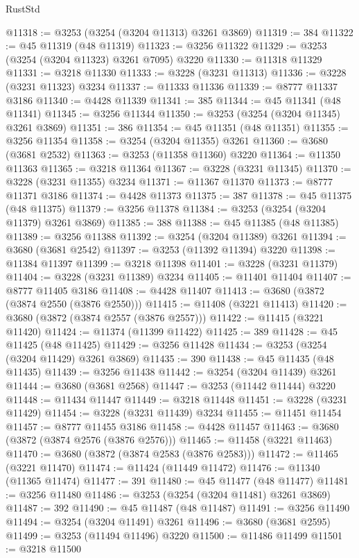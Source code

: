 \begin{lexlean}{RustStd}
\begin{coremodule}
{\begin{coremodule}
{{{{{{{{{{{{{{{{{{{{{{{{{{{{{{{{{{{{{@11318 := @3253 (@3254 (@3204 @11313) @3261 @3869)
@11319 := 384
@11322 := @45 @11319 (@48 @11319)
@11323 := @3256 @11322
@11329 := @3253 (@3254 (@3204 @11323) @3261 @7095) @3220
@11330 := @11318 @11329
@11331 := @3218 @11330
@11333 := @3228 (@3231 @11313)
@11336 := @3228 (@3231 @11323) @3234
@11337 := @11333 @11336
@11339 := @8777 @11337 @3186
@11340 := @4428 @11339
@11341 := 385
@11344 := @45 @11341 (@48 @11341)
@11345 := @3256 @11344
@11350 := @3253 (@3254 (@3204 @11345) @3261 @3869)
@11351 := 386
@11354 := @45 @11351 (@48 @11351)
@11355 := @3256 @11354
@11358 := @3254 (@3204 @11355) @3261
@11360 := @3680 (@3681 @2532)
@11363 := @3253 (@11358 @11360) @3220
@11364 := @11350 @11363
@11365 := @3218 @11364
@11367 := @3228 (@3231 @11345)
@11370 := @3228 (@3231 @11355) @3234
@11371 := @11367 @11370
@11373 := @8777 @11371 @3186
@11374 := @4428 @11373
@11375 := 387
@11378 := @45 @11375 (@48 @11375)
@11379 := @3256 @11378
@11384 := @3253 (@3254 (@3204 @11379) @3261 @3869)
@11385 := 388
@11388 := @45 @11385 (@48 @11385)
@11389 := @3256 @11388
@11392 := @3254 (@3204 @11389) @3261
@11394 := @3680 (@3681 @2542)
@11397 := @3253 (@11392 @11394) @3220
@11398 := @11384 @11397
@11399 := @3218 @11398
@11401 := @3228 (@3231 @11379)
@11404 := @3228 (@3231 @11389) @3234
@11405 := @11401 @11404
@11407 := @8777 @11405 @3186
@11408 := @4428 @11407
@11413 := @3680 (@3872 (@3874 @2550 (@3876 @2550)))
@11415 := @11408 (@3221 @11413)
@11420 := @3680 (@3872 (@3874 @2557 (@3876 @2557)))
@11422 := @11415 (@3221 @11420)
@11424 := @11374 (@11399 @11422)
@11425 := 389
@11428 := @45 @11425 (@48 @11425)
@11429 := @3256 @11428
@11434 := @3253 (@3254 (@3204 @11429) @3261 @3869)
@11435 := 390
@11438 := @45 @11435 (@48 @11435)
@11439 := @3256 @11438
@11442 := @3254 (@3204 @11439) @3261
@11444 := @3680 (@3681 @2568)
@11447 := @3253 (@11442 @11444) @3220
@11448 := @11434 @11447
@11449 := @3218 @11448
@11451 := @3228 (@3231 @11429)
@11454 := @3228 (@3231 @11439) @3234
@11455 := @11451 @11454
@11457 := @8777 @11455 @3186
@11458 := @4428 @11457
@11463 := @3680 (@3872 (@3874 @2576 (@3876 @2576)))
@11465 := @11458 (@3221 @11463)
@11470 := @3680 (@3872 (@3874 @2583 (@3876 @2583)))
@11472 := @11465 (@3221 @11470)
@11474 := @11424 (@11449 @11472)
@11476 := @11340 (@11365 @11474)
@11477 := 391
@11480 := @45 @11477 (@48 @11477)
@11481 := @3256 @11480
@11486 := @3253 (@3254 (@3204 @11481) @3261 @3869)
@11487 := 392
@11490 := @45 @11487 (@48 @11487)
@11491 := @3256 @11490
@11494 := @3254 (@3204 @11491) @3261
@11496 := @3680 (@3681 @2595)
@11499 := @3253 (@11494 @11496) @3220
@11500 := @11486 @11499
@11501 := @3218 @11500
}}}}}}}}}}}}}}}}}}}}}}}}}}}}}}}}}}}}}
\end{coremodule}}
\end{coremodule}
\end{lexlean}
